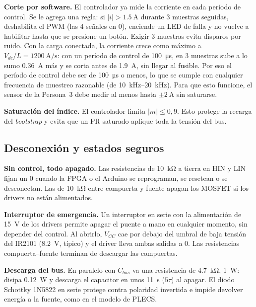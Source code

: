 \documentclass[10pt,twocolumn,letterpaper]{article}
\begin{document}
\textbf{Corte por software.} El controlador ya mide la corriente en cada período de control. Se le agrega una regla: si $|i|>\SI{1,5}{\ampere}$ durante 3 muestras seguidas, deshabilita el PWM (las 4 señales en 0), enciende un LED de falla y no vuelve a habilitar hasta que se presione un botón. Exigir 3 muestras evita disparos por ruido. Con la carga conectada, la corriente crece como máximo a $V_{dc}/L=\SI{1200}{\ampere\per\second}$: con un período de control de \SI{100}{\micro\second}, en 3 muestras sube a lo sumo \SI{0,36}{\ampere} más y se corta antes de \SI{1,9}{\ampere}, sin llegar al fusible. Por eso el período de control debe ser de \SI{100}{\micro\second} o menos, lo que se cumple con cualquier frecuencia de muestreo razonable (de \SIrange{10}{20}{\kilo\hertz}). Para que esto funcione, el sensor de la Persona~3 debe medir al menos hasta $\pm\SI{2}{\ampere}$ sin saturarse.

\textbf{Saturación del índice.} El controlador limita $|m|\le0{,}9$. Esto protege la recarga del \emph{bootstrap} y evita que un PR saturado aplique toda la tensión del bus.

\subsection{Desconexión y estados seguros}
\textbf{Sin control, todo apagado.} Las resistencias de \SI{10}{\kilo\ohm} a tierra en HIN y LIN fijan un 0 cuando la FPGA o el Arduino se reprograman, se resetean o se desconectan. Las de \SI{10}{\kilo\ohm} entre compuerta y fuente apagan los MOSFET si los drivers no están alimentados.

\textbf{Interruptor de emergencia.} Un interruptor en serie con la alimentación de \SI{15}{\volt} de los drivers permite apagar el puente a mano en cualquier momento, sin depender del control. Al abrirlo, $V_{CC}$ cae por debajo del umbral de baja tensión del IR2101 (\SI{8,2}{\volt}, típico) y el driver lleva ambas salidas a 0. Las resistencias compuerta--fuente terminan de descargar las compuertas.

\textbf{Descarga del bus.} En paralelo con $C_{bus}$ va una resistencia de \SI{4,7}{\kilo\ohm}, \SI{1}{\watt}: disipa \SI{0,12}{\watt} y descarga el capacitor en unos \SI{11}{\second} ($5\tau$) al apagar. El diodo Schottky 1N5822 en serie protege contra polaridad invertida e impide devolver energía a la fuente, como en el modelo de PLECS.
\end{document}
